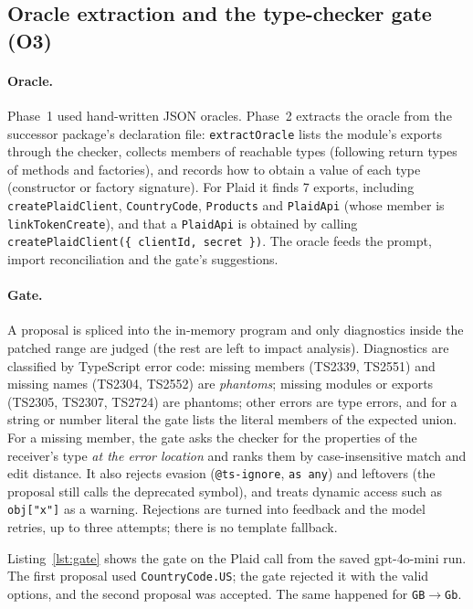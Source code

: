 \documentclass[11pt,a4paper]{article}
\newcommand{\code}[1]{\texttt{#1}}
\begin{document}
\subsection{Oracle extraction and the type-checker gate (O3)}

\paragraph{Oracle.}
Phase~1 used hand-written JSON oracles. Phase~2 extracts the oracle from the successor
package's declaration file: \code{extractOracle} lists the module's exports through the
checker, collects members of reachable types (following return types of methods and
factories), and records how to obtain a value of each type (constructor or factory
signature). For Plaid it finds 7 exports, including \code{createPlaidClient}, \code{CountryCode},
\code{Products} and \code{PlaidApi} (whose member is \code{linkTokenCreate}), and that a
\code{PlaidApi} is obtained by calling \code{createPlaidClient(\{ clientId, secret \})}.
The oracle feeds the prompt, import reconciliation and the gate's suggestions.

\paragraph{Gate.}
A proposal is spliced into the in-memory program and only diagnostics inside the patched
range are judged (the rest are left to impact analysis). Diagnostics are classified by
TypeScript error code: missing members (TS2339, TS2551) and missing names (TS2304, TS2552)
are \emph{phantoms}; missing modules or exports (TS2305, TS2307, TS2724) are phantoms; other
errors are type errors, and for a string or number literal the gate lists the literal members
of the expected union. For a missing member, the gate asks the checker for the properties of
the receiver's type \emph{at the error location} and ranks them by case-insensitive match and
edit distance. It also rejects evasion (\code{@ts-ignore}, \code{as any}) and leftovers (the
proposal still calls the deprecated symbol), and treats dynamic access such as
\code{obj["x"]} as a warning. Rejections are turned into feedback and the model retries, up
to three attempts; there is no template fallback.

Listing~\ref{lst:gate} shows the gate on the Plaid call from the saved gpt-4o-mini run. The
first proposal used \code{CountryCode.US}; the gate rejected it with the valid options, and
the second proposal was accepted. The same happened for \code{GB}$\rightarrow$\code{Gb}.
\end{document}
